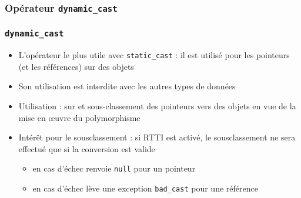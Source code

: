 \subsubsection{Opérateur \texttt{dynamic\_cast}}

\begin{frame}[fragile]
\frametitle{\texttt{dynamic\_cast}}
\begin{itemize}
\item L'opérateur le plus utile avec \verb|static_cast| : il est utilisé pour les pointeurs (et les références) sur des objets
\item Son utilisation est interdite avec les autres types de données
\item Utilisation : sur et sous-classement des pointeurs vers des objets en vue de la mise en \oe uvre du polymorphisme
\item Intérêt pour le sousclassement : si RTTI est activé, le sousclassement ne sera effectué que si la conversion est valide
\begin{itemize}
\item en cas d'échec renvoie \verb|null| pour un pointeur
\item en cas d'échec lève une exception \verb|bad_cast| pour une référence
\end{itemize}
\end{itemize}
\end{frame}

